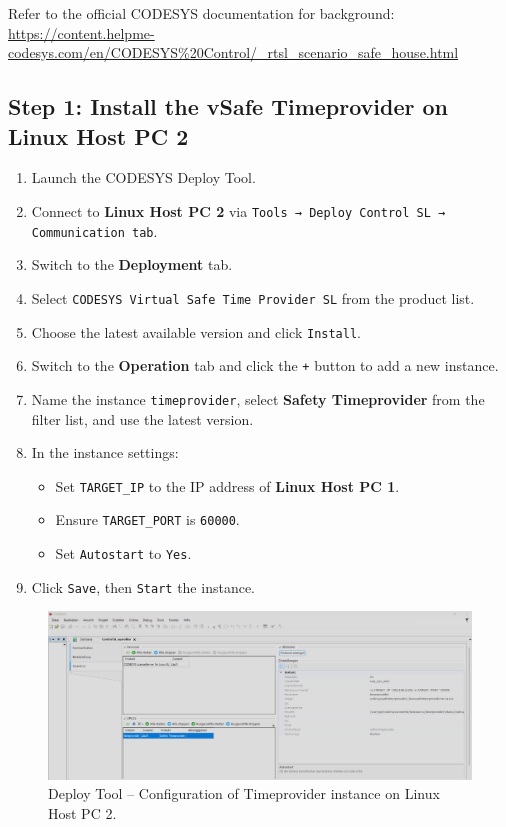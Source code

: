 \documentclass[a4paper,12pt]{article}
\begin{document}
\vspace{0.5em}
Refer to the official CODESYS documentation for background:
\url{https://content.helpme-codesys.com/en/CODESYS%20Control/_rtsl_scenario_safe_house.html}

\subsection*{Step 1: Install the vSafe Timeprovider on Linux Host PC 2}

\begin{enumerate}
	\item Launch the CODESYS Deploy Tool.
	\item Connect to \textbf{Linux Host PC 2} via \texttt{Tools → Deploy Control SL → Communication tab}.
	\item Switch to the \textbf{Deployment} tab.
	\item Select \texttt{CODESYS Virtual Safe Time Provider SL} from the product list.
	\item Choose the latest available version and click \texttt{Install}.
	\item Switch to the \textbf{Operation} tab and click the \texttt{+} button to add a new instance.
	\item Name the instance \texttt{timeprovider}, select \textbf{Safety Timeprovider} from the filter list, and use the latest version.
	\item In the instance settings:
	\begin{itemize}
		\item Set \texttt{TARGET\_IP} to the IP address of \textbf{Linux Host PC 1}.
		\item Ensure \texttt{TARGET\_PORT} is \texttt{60000}.
		\item Set \texttt{Autostart} to \texttt{Yes}.
	\end{itemize}
	\item Click \texttt{Save}, then \texttt{Start} the instance.
\end{enumerate}

\begin{figure}[H]
	\centering
	\includegraphics[width=1\textwidth]{5.PNG}
	\caption{Deploy Tool – Configuration of Timeprovider instance on Linux Host PC 2.}
\end{figure}
\end{document}

